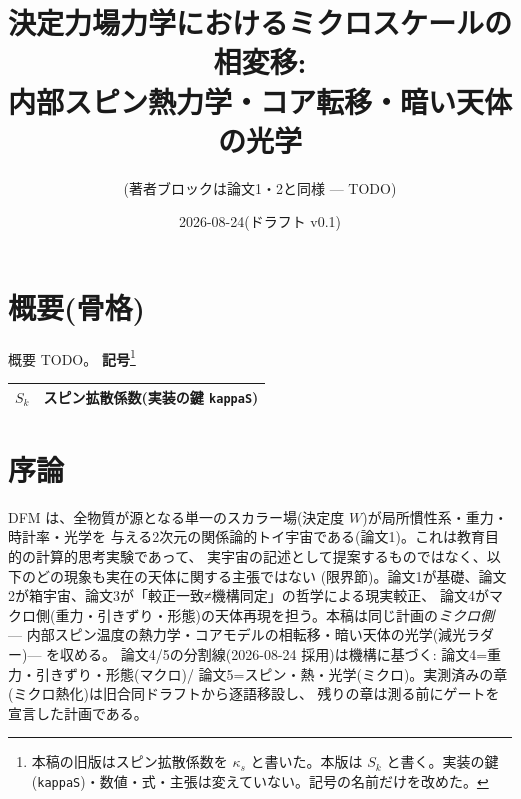 \documentclass[a4paper,10pt,twocolumn]{ltjsarticle}
\title{決定力場力学におけるミクロスケールの相変移:\\
内部スピン熱力学・コア転移・暗い天体の光学}
\author{(著者ブロックは論文1・2と同様 — TODO)}
\date{2026-08-24(ドラフト v0.1)}
\begin{document}
\maketitle

\section*{概要(骨格)}
概要 TODO。
\noindent\textbf{記号}\footnote{本稿の旧版はスピン拡散係数を $\kappa_s$ と書いた。本版は $S_k$ と書く。実装の鍵(\texttt{kappaS})・数値・式・主張は変えていない。記号の名前だけを改めた。}
\begin{center}
\small
\begin{tabular}{@{}lp{}@{}}
\hline
$S_k$ & スピン拡散係数(実装の鍵 \texttt{kappaS}) \\
\hline
\end{tabular}
\end{center}


\section{序論}
DFM は、全物質が源となる単一のスカラー場(決定度 $W$)が局所慣性系・重力・時計率・光学を
与える2次元の関係論的トイ宇宙である(論文1)。これは教育目的の計算的思考実験であって、
実宇宙の記述として提案するものではなく、以下のどの現象も実在の天体に関する主張ではない
(限界節)。論文1が基礎、論文2が箱宇宙、論文3が「較正一致≠機構同定」の哲学による現実較正、
論文4がマクロ側(重力・引きずり・形態)の天体再現を担う。本稿は同じ計画の\emph{ミクロ側} —
内部スピン温度の熱力学・コアモデルの相転移・暗い天体の光学(減光ラダー)— を収める。
論文4/5の分割線(2026-08-24 採用)は機構に基づく: 論文4=重力・引きずり・形態(マクロ)/
論文5=スピン・熱・光学(ミクロ)。実測済みの章(ミクロ熱化)は旧合同ドラフトから逐語移設し、
残りの章は測る前にゲートを宣言した計画である。
\end{document}
